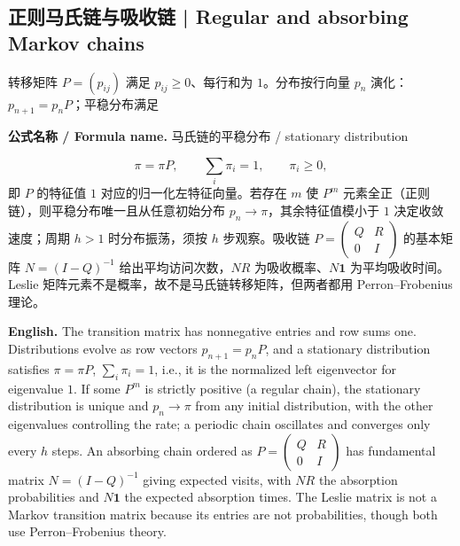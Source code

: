 \documentclass[UTF8,11pt,a4paper]{ctexart}
\newcommand{\EN}[1]{\par\noindent\textbf{English.} #1\par}
\newcommand{\FORMULA}[2]{\par\noindent\textbf{公式名称 / Formula name.} #1 / #2\par}
\begin{document}
\subsection{正则马氏链与吸收链 | Regular and absorbing Markov chains}
转移矩阵 $P=(p_{ij})$ 满足 $p_{ij}\ge0$、每行和为 $1$。分布按行向量 $p_n$ 演化：$p_{n+1}=p_nP$；平稳分布满足
\FORMULA{马氏链的平稳分布}{stationary distribution}
\[
\pi=\pi P,\qquad \sum_i\pi_i=1,\qquad \pi_i\ge0,
\]
即 $P$ 的特征值 $1$ 对应的归一化左特征向量。若存在 $m$ 使 $P^m$ 元素全正（正则链），则平稳分布唯一且从任意初始分布 $p_n\to\pi$，其余特征值模小于 $1$ 决定收敛速度；周期 $h>1$ 时分布振荡，须按 $h$ 步观察。吸收链 $P=\begin{pmatrix}Q&R\\0&I\end{pmatrix}$ 的基本矩阵 $N=(I-Q)^{-1}$ 给出平均访问次数，$NR$ 为吸收概率、$N\mathbf 1$ 为平均吸收时间。Leslie 矩阵元素不是概率，故不是马氏链转移矩阵，但两者都用 Perron--Frobenius 理论。
\EN{The transition matrix has nonnegative entries and row sums one. Distributions evolve as row vectors $p_{n+1}=p_nP$, and a stationary distribution satisfies $\pi=\pi P$, $\sum_i\pi_i=1$, i.e., it is the normalized left eigenvector for eigenvalue $1$. If some $P^m$ is strictly positive (a regular chain), the stationary distribution is unique and $p_n\to\pi$ from any initial distribution, with the other eigenvalues controlling the rate; a periodic chain oscillates and converges only every $h$ steps. An absorbing chain ordered as $P=\begin{pmatrix}Q&R\\0&I\end{pmatrix}$ has fundamental matrix $N=(I-Q)^{-1}$ giving expected visits, with $NR$ the absorption probabilities and $N\mathbf 1$ the expected absorption times. The Leslie matrix is not a Markov transition matrix because its entries are not probabilities, though both use Perron--Frobenius theory.}
\end{document}
